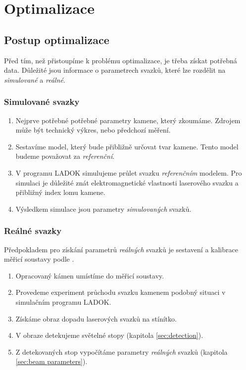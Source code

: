 \chapter{Optimalizace}
	
\section{Postup optimalizace}
	Před tím, než přistoupíme k problému optimalizace, je třeba získat potřebná data. Důležité jsou informace o parametrech svazků, které lze rozdělit na \textit{simulované} a \textit{reálné}.

\subsection*{Simulované svazky}
\begin{enumerate}

\item 	Nejprve potřebné potřebné parametry kamene, který zkoumáme. Zdrojem může být technický výkres, nebo předchozí měření.  

\item	Sestavíme model, který bude přibližně určovat tvar kamene. Tento model budeme považovat za \textit{referenční}.

\item	V programu LADOK simulujeme průlet svazku \textit{referenčním} modelem. Pro simulaci je důležité znát elektromagnetické vlastnosti laserového svazku a přibližný index lomu kamene. 

\item	Výsledkem simulace jsou parametry \textit{simulovaných} svazků.

\end{enumerate}

\subsection*{Reálné svazky}
Předpokladem pro získání parametrů \textit{reálných} svazků je sestavení a kalibrace měřicí soustavy podle \cite{Drapela}. 
\begin{enumerate}

\item 	Opracovaný kámen umístíme do měřicí soustavy.

\item	Provedeme experiment průchodu svazku kamenem podobný situaci v simulačním programu LADOK. 

\item	Získáme obraz dopadu laserových svazků na stínítko. 

\item	V obraze detekujeme světelné stopy (kapitola \ref{sec:detection}).  

\item	Z detekovaných stop vypočítáme parametry \textit{reálných} svazků (kapitola \ref{sec:beam parameters}).

\end{enumerate}


